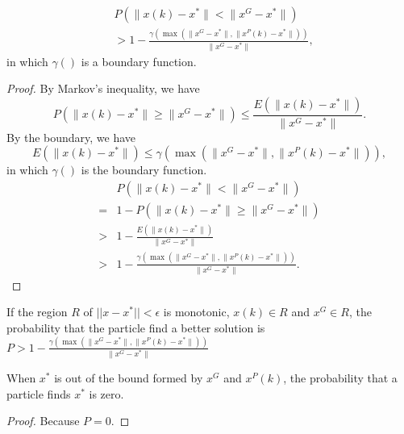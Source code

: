 \begin{mycoro}
\label{lem:mutimodal:particle:prob}
\begin{equation}
\begin{aligned}
& P( \lVert x(k) - x^{*} \rVert < \lVert x^{G} - x^{*} \rVert ) \\
& > 1 - \frac{ \gamma ( \max ( \lVert x^{G} - x^{*} \rVert , \lVert x^{P}(k) - x^{*}  \rVert ) ) }{ \lVert x^{G} - x^{*} \rVert },
\end{aligned}
\end{equation}
in which $ \gamma () $ is a boundary function.
\begin{proof}
By Markov's inequality, we have
\begin{equation}
P( \lVert x(k) - x^{*} \rVert \geq \lVert x^{G} - x^{*} \rVert ) \leq \frac{ E( \lVert x(k) - x^{*} \rVert ) }{ \lVert x^{G} - x^{*} \rVert }.
\end{equation} 
By the boundary, we have
\begin{equation}
E( \lVert x(k) - x^{*} \rVert ) \leq \gamma ( \max ( \lVert x^{G} - x^{*} \rVert , \lVert x^{P}(k) - x^{*}  \rVert ) ),
\end{equation}
in which $ \gamma () $ is the boundary function.
\begin{equation}
\begin{aligned}
& P( \lVert x(k) - x^{*} \rVert < \lVert x^{G} - x^{*} \rVert ) \\
= & 1 - P( \lVert x(k) - x^{*} \rVert \geq \lVert x^{G} - x^{*} \rVert ) \\
> & 1 - \frac{ E( \lVert x(k) - x^{*} \rVert ) }{ \lVert x^{G} - x^{*} \rVert } \\
> & 1 - \frac{ \gamma ( \max ( \lVert x^{G} - x^{*} \rVert , \lVert x^{P}(k) - x^{*}  \rVert ) ) }{ \lVert x^{G} - x^{*} \rVert }.
\end{aligned}
\end{equation}
\end{proof}
\end{mycoro}

\begin{mythm}
\label{thm:multimodal:in_scope}
If the region $ R $ of $ || x - x^{*} || < \epsilon $ is monotonic, $ x(k) \in R $ and $ x^{G} \in R $, the probability that the particle find a better solution is $ P > 1 - \frac{ \gamma ( \max ( \lVert x^{G} - x^{*} \rVert , \lVert x^{P}(k) - x^{*}  \rVert ) ) }{ \lVert x^{G} - x^{*} \rVert } $
\end{mythm} 

\begin{mythm}
\label{thm:multimodal:out_of_scope}
When $ x^{*} $ is out of the bound formed by $ x^{G} $ and $ x^{P}(k) $, the probability that a particle finds $ x^{*} $ is zero.
\begin{proof}
Because $ P = 0 $.
\end{proof}
\end{mythm}



